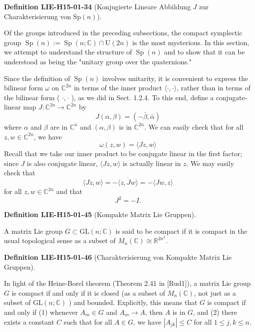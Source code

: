 \documentclass[10pt, letterpaper]{article}
\newcommand{\Sp}{\mathrm{Sp}}
\newcommand{\CustomHeading}[3]{%
  \par\medskip\noindent%
  \textbf{#1 #2} \textnormal{(#3)}.\enskip%
}
\newenvironment{DEF}[2]{\CustomHeading{Definition}{#1}{#2}}{}
\begin{document}
\begin{DEF}{LIE-H15-01-34}{Konjugierte Lineare Abbildung $J$ zur Charakterisierung von $\Sp(n)$}
Of the groups introduced in the preceding subsections, the compact symplectic group $\operatorname{Sp}(n):=\operatorname{Sp}(n ; \mathbb{C}) \cap \mathrm{U}(2 n)$ is the most mysterious. In this section, we attempt to understand the structure of $\operatorname{Sp}(n)$ and to show that it can be understood as being the "unitary group over the quaternions."

Since the definition of $\operatorname{Sp}(n)$ involves unitarity, it is convenient to express the bilinear form $\omega$ on $\mathbb{C}^{2 n}$ in terms of the inner product $\langle\cdot, \cdot\rangle$, rather than in terms of the bilinear form ( $\cdot, \cdot$ ), as we did in Sect. 1.2.4. To this end, define a conjugate-linear map $J: \mathbb{C}^{2 n} \rightarrow \mathbb{C}^{2 n}$ by
$$
J(\alpha, \beta)=(-\bar{\beta}, \bar{\alpha})
$$
where $\alpha$ and $\beta$ are in $\mathbb{C}^{n}$ and $(\alpha, \beta)$ is in $\mathbb{C}^{2 n}$. We can easily check that for all $z, w \in \mathbb{C}^{2 n}$, we have
$$
\omega(z, w)=\langle J z, w\rangle
$$
Recall that we take our inner product to be conjugate linear in the first factor; since $J$ is also conjugate linear, $\langle J z, w\rangle$ is actually linear in $z$. We may easily check that
$$
\langle J z, w\rangle=-\overline{\langle z, J w\rangle}=-\langle J w, z\rangle
$$
for all $z, w \in \mathbb{C}^{2 n}$ and that
$$
J^{2}=-I .
$$
\end{DEF}

\begin{DEF}{LIE-H15-01-45}{Kompakte Matrix Lie Gruppen}
A matrix Lie group $G \subset \mathrm{GL}(n ; \mathbb{C})$ is said to be compact if it is compact in the usual topological sense as a subset of $M_{n}(\mathbb{C}) \cong \mathbb{R}^{2 n^{2}}$.
\end{DEF}

\begin{DEF}{LIE-H15-01-46}{Charakterisierung von Kompakte Matrix Lie Gruppen}
In light of the Heine-Borel theorem (Theorem 2.41 in [Rud1]), a matrix Lie group $G$ is compact if and only if it is closed (as a subset of $M_{n}(\mathbb{C})$, not just as a subset of $\mathrm{GL}(n ; \mathbb{C})$ ) and bounded. Explicitly, this means that $G$ is compact if and only if (1) whenever $A_{m} \in G$ and $A_{m} \rightarrow A$, then $A$ is in $G$, and (2) there exists a constant $C$ such that for all $A \in G$, we have $\left|A_{j k}\right| \leq C$ for all $1 \leq j, k \leq n$.
\end{DEF}
\end{document}
